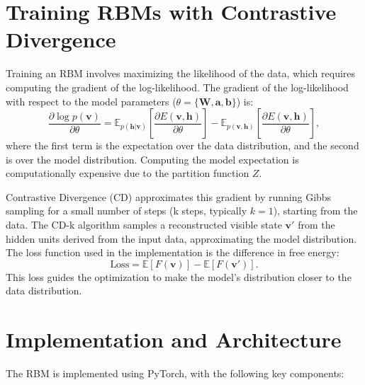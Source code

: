 \documentclass{article}
\begin{document}
\section{Training RBMs with Contrastive Divergence}
Training an RBM involves maximizing the likelihood of the data, which requires computing the gradient of the log-likelihood. The gradient of the log-likelihood with respect to the model parameters (\(\theta = \{\mathbf{W}, \mathbf{a}, \mathbf{b}\}\)) is:
\[
\frac{\partial \log p(\mathbf{v})}{\partial \theta} = \mathbb{E}_{p(\mathbf{h}|\mathbf{v})}[\frac{\partial E(\mathbf{v}, \mathbf{h})}{\partial \theta}] - \mathbb{E}_{p(\mathbf{v}, \mathbf{h})}[\frac{\partial E(\mathbf{v}, \mathbf{h})}{\partial \theta}],
\]
where the first term is the expectation over the data distribution, and the second is over the model distribution. Computing the model expectation is computationally expensive due to the partition function \( Z \).

Contrastive Divergence (CD) approximates this gradient by running Gibbs sampling for a small number of steps (k steps, typically \( k=1 \)), starting from the data. The CD-k algorithm samples a reconstructed visible state \( \mathbf{v}' \) from the hidden units derived from the input data, approximating the model distribution. The loss function used in the implementation is the difference in free energy:
\[
\text{Loss} = \mathbb{E}[F(\mathbf{v})] - \mathbb{E}[F(\mathbf{v}')].
\]
This loss guides the optimization to make the model's distribution closer to the data distribution.

\section{Implementation and Architecture}
The RBM is implemented using PyTorch, with the following key components:
\end{document}
